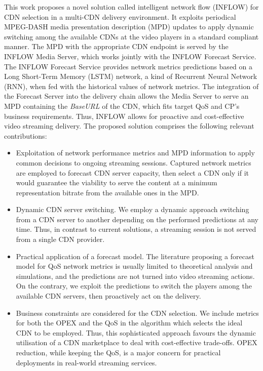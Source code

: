 This work proposes a novel solution called intelligent network flow (INFLOW) for CDN selection in a multi-CDN delivery environment. It exploits periodical MPEG-DASH media presentation description (MPD) updates to apply dynamic switching among the available CDNs at the video players in a standard compliant manner. The MPD with the appropriate CDN endpoint is served by the INFLOW Media Server, which works jointly with the INFLOW Forecast Service. The INFLOW Forecast Service provides network metrics predictions based on a Long Short-Term Memory (LSTM) network, a kind of Recurrent Neural Network (RNN), when fed with the historical values of network metrics. The integration of the Forecast Server into the delivery chain allows the Media Server to serve an MPD containing the \textit{BaseURL} of the CDN, which fits target QoS and CP's business requirements. Thus, INFLOW allows for proactive and cost-effective video streaming delivery. 
The proposed solution comprises the following relevant contributions:
\begin{itemize}
	\item Exploitation of network performance metrics and MPD information to apply common decisions to ongoing streaming sessions. Captured network metrics are employed to forecast CDN server capacity, then select a CDN only if it would guarantee the viability to serve the content at a minimum representation bitrate from the available ones in the MPD.
	\item Dynamic CDN server switching. We employ a dynamic approach switching from a CDN server to another depending on the performed predictions at any time. Thus, in contrast to current solutions, a streaming session is not served from a single CDN provider.
	\item Practical application of a forecast model. The literature proposing a forecast model for QoS network metrics is usually limited to theoretical analysis and simulations, and the predictions are not turned into video streaming actions. On the contrary, we exploit the predictions to switch the players among the available CDN servers, then proactively act on the delivery.
	\item Business constraints are considered for the CDN selection. We include metrics for both the OPEX and the QoS in the algorithm which selects the ideal CDN to be employed. Thus, this sophisticated approach favours the dynamic utilisation of a CDN marketplace to deal with cost-effective trade-offs. OPEX reduction, while keeping the QoS, is a major concern for practical deployments in real-world streaming services.
\end{itemize}
